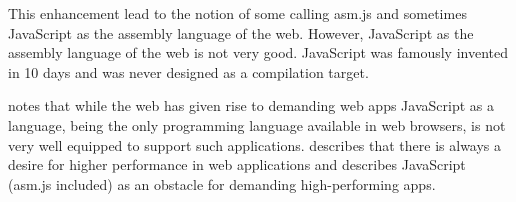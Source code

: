 This enhancement lead to the notion of some calling asm.js and sometimes JavaScript as the assembly language of the web. However, JavaScript as the assembly language of the web is not very good. JavaScript was famously invented in 10 days and was never designed as a compilation target.

\textcite{HaasRossbergSchuffTitzerHolmanGohmanWagnerZakaiBastien2017} notes that while the web has given rise to demanding web apps JavaScript as a language, being the only programming language available in web browsers, is not very well equipped to support such applications. \textcite{ReiserBlaser2017} describes that there is always a desire for higher performance in web applications and \textcite{Zakai2018} describes JavaScript (asm.js included) as an obstacle for demanding high-performing apps.









